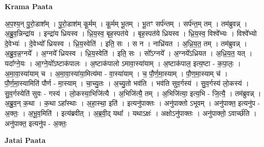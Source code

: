 \documentclass[17pt]{extarticle}
\begin{document}
\textbf{Krama Paata} \newline

अ॒प॒श्य॒न् पु॒रो॒डाश᳚म् । पु॒रो॒डाश॑म् कू॒र्मम् । कू॒र्मम् भू॒तम् । भू॒तꣳ सर्प॑न्तम् । सर्प॑न्त॒म् तम् । तम॑ब्रुवन्न् । अ॒ब्रु॒व॒न्निन्द्रा॑य । इन्द्रा॑य ध्रियस्व । ध्रि॒य॒स्व॒ बृह॒स्पत॑ये । बृह॒स्पत॑ये ध्रियस्व । ध्रि॒य॒स्व॒ विश्वे᳚भ्यः । विश्वे᳚भ्यो दे॒वेभ्यः॑ । दे॒वेभ्यो᳚ ध्रियस्व । ध्रि॒य॒स्वेति॑ । इति॒ सः । स न । नाध्रि॑यत । अ॒ध्रि॒य॒त॒ तम् । तम॑ब्रुवन्न् । अ॒ब्रु॒व॒न्न॒ग्नये᳚ । अ॒ग्नये᳚ ध्रियस्व । ध्रि॒य॒स्वेति॑ । इति॒ सः । सो᳚ऽग्नये᳚ । अ॒ग्नये᳚ऽध्रियत । अ॒ध्रि॒य॒त॒ यत् । यदा᳚ग्ने॒यः । आ॒ग्ने॒यो᳚ऽष्टाक॑पालः । अ॒ष्टाक॑पालो ऽमावा॒स्या॑याम् । अ॒ष्टाक॑पाल॒ इत्य॒ष्टा - क॒पा॒लः॒ । अ॒मा॒वा॒स्या॑याम् च । अ॒मा॒वा॒स्या॑या॒मित्य॑मा - वा॒स्या॑याम् । च॒ पौ॒र्ण॒मा॒स्याम् । पौ॒ण॒मा॒स्याम् च॑ । पौ॒र्ण॒मा॒स्यामिति॑ पौर्ण - मा॒स्याम् । चा॒च्यु॒तः । अ॒च्यु॒तो भव॑ति । भव॑ति सुव॒र्गस्य॑ । सु॒व॒र्गस्य॑ लो॒कस्य॑ । सु॒व॒र्गस्येति॑ सुवः - गस्य॑ । लो॒कस्या॒भिजि॑त्यै । अ॒भिजि॑त्यै॒ तम् । अ॒भिजि॑त्या॒ इत्य॒भि - जि॒त्यै॒ । तम॑ब्रुवन्न् । अ॒ब्रु॒व॒न् क॒था । क॒था ऽहा᳚स्थाः । अ॒हा॒स्था॒ इति॑ । इत्यनु॑पाक्तः । अनु॑पाक्तो ऽभूवम् । अनु॑पाक्त॒ इत्यनु॑प - अ॒क्तः॒ । अ॒भू॒व॒मिति॑ । इत्य॑ब्रवीत् । अ॒ब्र॒वी॒द् यथा᳚ । यथाऽक्षः॑ । अक्षोऽनु॑पाक्तः । अनु॑पाक्तो॒ ऽवार्च्छ॑ति । अनु॑पाक्त॒ इत्यनु॑प - अ॒क्तः॒ \newline

\textbf{Jatai Paata} \newline
\end{document}
